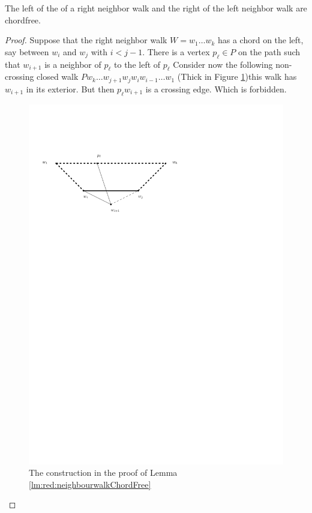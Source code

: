   \begin{lemma}
    \label{lm:red:neighbourwalkChordFree}
    The left of the of a right neighbor walk and the right of the left neighbor walk are chordfree.
  \end{lemma}
  \begin{proof}
    Suppose that the right neighbor walk $W = w_1 \ldots w_k$  has a chord on the left, say between $w_i$ and $w_j$ with $i< j -1 $. There is a vertex $p_\ell \in P$ on the path such that $w_{i+1}$ is a neighbor of $p_\ell$ to the left of $p_\ell$ Consider now the following non-crossing closed walk $P w_k \ldots w_{j+1} w_j w_i w_{i-1} \ldots w_1$
    (Thick in Figure \ref{fig:red:neihbourwalkChordFree})this walk has $w_{i+1}$ in its exterior. But then $p_\ell w_{i+1}$ is a crossing edge. Which is forbidden.

    \begin{figure}[h]
      \centering
      \includegraphics[scale=1]{redAlgo/img/neighbourWalkChords}
      \caption{The construction in the proof of Lemma \ref{lm:red:neighbourwalkChordFree}}
      \label{fig:red:neihbourwalkChordFree}
    \end{figure}
  \end{proof}


